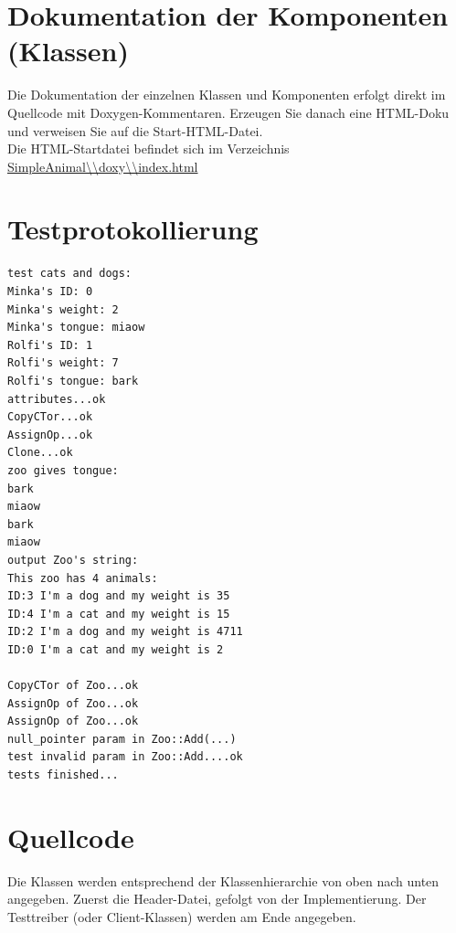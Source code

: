 \documentclass[12pt,naustrian,a4widepaper]{scrartcl}
\begin{document}
\color{black}

\section{Dokumentation der Komponenten (Klassen)}
\color{blue}
Die Dokumentation der einzelnen Klassen und Komponenten erfolgt direkt im Quellcode mit Doxygen-Kommentaren. Erzeugen Sie danach 
eine HTML-Doku und verweisen Sie auf die Start-HTML-Datei.\\

\color{black}
Die HTML-Startdatei befindet sich im Verzeichnis \url{SimpleAnimal\\doxy\\index.html}

\clearpage
\section{Testprotokollierung}

\begin{verbatim}
test cats and dogs:
Minka's ID: 0
Minka's weight: 2
Minka's tongue: miaow
Rolfi's ID: 1
Rolfi's weight: 7
Rolfi's tongue: bark
attributes...ok
CopyCTor...ok
AssignOp...ok
Clone...ok
zoo gives tongue:
bark
miaow
bark
miaow
output Zoo's string:
This zoo has 4 animals:
ID:3 I'm a dog and my weight is 35
ID:4 I'm a cat and my weight is 15
ID:2 I'm a dog and my weight is 4711
ID:0 I'm a cat and my weight is 2

CopyCTor of Zoo...ok
AssignOp of Zoo...ok
AssignOp of Zoo...ok
null_pointer param in Zoo::Add(...)
test invalid param in Zoo::Add....ok
tests finished...
\end{verbatim}

\clearpage
\section{Quellcode}
\color{blue}
Die Klassen werden entsprechend der Klassenhierarchie von oben nach unten angegeben. Zuerst die Header-Datei, gefolgt von der Implementierung.
Der Testtreiber (oder Client-Klassen) werden am Ende angegeben.
\color{black}
\end{document}
